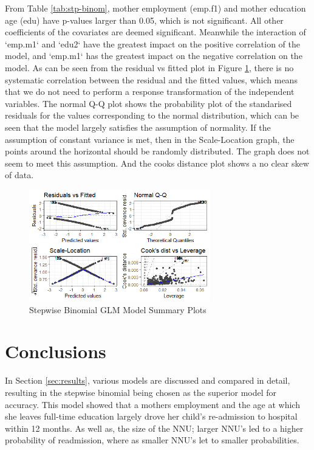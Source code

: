 \documentclass[11pt]{article}
\begin{document}
From Table \ref{tab:stp-binom}, mother employment (emp.f1) and mother education age (edu) have p-values larger than 0.05, which is not significant. All other coefficients of the covariates are deemed significant. Meanwhile the interaction of `emp.m1` and `edu2` have the greatest impact on the positive correlation of the model, and `emp.m1` has the greatest impact on the negative correlation on the model. As can be seen from the residual vs fitted plot in Figure \ref{img:glm-step-binom}, there is no systematic correlation between the residual and the fitted values, which means that we do not need to perform a response transformation of the independent variables. The normal Q-Q plot shows the probability plot of the standarised residuals for the values corresponding to the normal distribution, which can be seen that the model largely satisfies the assumption of normality. If the assumption of constant variance is met, then in the Scale-Location graph, the points around the horizontal should be randomly distributed. The graph does not seem to meet this assumption. And the cooks distance plot shows a no clear skew of data.

\begin{figure}[ht]
    \centering
    \includegraphics[width=0.7\textwidth]{images/mod.step.1.png}
    \caption{Stepwise Binomial GLM Model Summary Plots}
    \label{img:glm-step-binom}
\end{figure}

\section{Conclusions}\label{sec:conclusions}
In Section \ref{sec:results}, various models are discussed and compared in detail, resulting in the stepwise binomial being chosen as the superior model for accuracy. This model showed that a mothers employment and the age at which she leaves full-time education largely drove her child's re-admission to hospital within 12 months. As well as, the size of the NNU; larger NNU's led to a higher probability of readmission, where as smaller NNU's let to smaller probabilities. 
\end{document}
